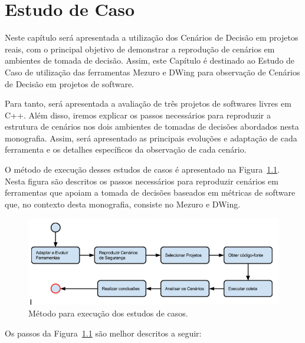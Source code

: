 \chapter{Estudo de Caso}
\label{cap-case-study}

%

Neste capítulo será apresentada a utilização dos Cenários de Decisão em projetos reais, com o principal objetivo de demonstrar a reprodução de cenários em ambientes de tomada de decisão. Assim, este Capítulo é destinado ao Estudo de Caso de utilização das ferramentas Mezuro e DWing para observação de Cenários de Decisão em projetos de software.

Para tanto, será apresentada a avaliação de três projetos de softwares livres em C++. Além disso, iremos explicar os passos necessários para reproduzir a estrutura de cenários nos dois ambientes de tomadas de decisões abordados nesta monografia. Assim, será apresentado as principais evoluções e adaptação de cada ferramenta e os detalhes específicos da observação de cada cenário.

O método de execução desses estudos de casos é apresentado na Figura~\ref{method}. Nesta figura são descritos os passos necessários para reproduzir cenários em ferramentas que apoiam a tomada de decisões baseados em métricas de software que, no contexto desta monografia, consiste no Mezuro e DWing.

\graphicspath{{figuras/}}
\begin{figure}[h]
\centering
\includegraphics[width=1.0\textwidth]{fluxograma}
\caption{Método para execução dos estudos de casos.}
\label{method}
\end{figure}

Os passos da Figura~\ref{method} são melhor descritos a seguir:

